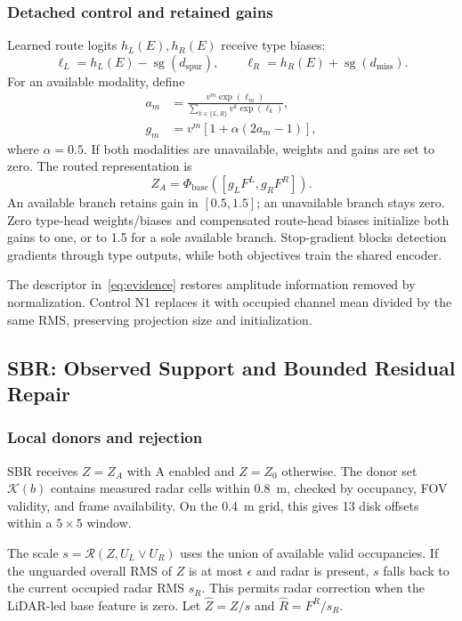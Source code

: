 \documentclass[conference]{IEEEtran}
\DeclareMathOperator{\sg}{sg}
\begin{document}
\subsubsection{Detached control and retained gains}
Learned route logits $h_L(E),h_R(E)$ receive type biases:
\begin{equation}
\ell_L=h_L(E)-\sg(d_{\mathrm{spur}}),\qquad
\ell_R=h_R(E)+\sg(d_{\mathrm{miss}}). \label{eq:route}
\end{equation}
For an available modality, define
\begin{equation}
\begin{aligned}
a_m&=\frac{v^m\exp(\ell_m)}{\sum_{k\in\{L,R\}}v^k\exp(\ell_k)},\\
g_m&=v^m[1+\alpha(2a_m-1)],
\end{aligned}\label{eq:gain}
\end{equation}
where $\alpha=0.5$. If both modalities are unavailable, weights and gains are set to zero. The routed representation is
\begin{equation}
Z_A=\Phi_{\mathrm{base}}([g_LF^L,g_RF^R]). \label{eq:routed}
\end{equation}
An available branch retains gain in $[0.5,1.5]$; an unavailable branch stays zero. Zero type-head weights/biases and compensated route-head biases initialize both gains to one, or to 1.5 for a sole available branch. Stop-gradient blocks detection gradients through type outputs, while both objectives train the shared encoder.

The descriptor in~\eqref{eq:evidence} restores amplitude information removed by normalization. Control N1 replaces it with occupied channel mean divided by the same RMS, preserving projection size and initialization.

\subsection{SBR: Observed Support and Bounded Residual Repair}
\subsubsection{Local donors and rejection}
SBR receives $Z=Z_A$ with A enabled and $Z=Z_0$ otherwise. The donor set $\mathcal K(b)$ contains measured radar cells within 0.8~m, checked by occupancy, FOV validity, and frame availability. On the 0.4~m grid, this gives 13 disk offsets within a $5\times5$ window.

The scale $s=\mathcal R(Z,U_L\lor U_R)$ uses the union of available valid occupancies. If the unguarded overall RMS of $Z$ is at most $\epsilon$ and radar is present, $s$ falls back to the current occupied radar RMS $s_R$. This permits radar correction when the LiDAR-led base feature is zero. Let $\widehat Z=Z/s$ and $\widehat R=F^R/s_R$.
\end{document}
